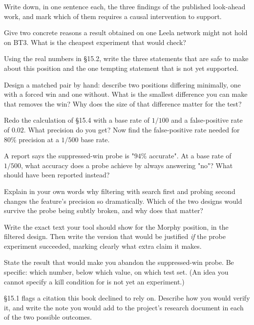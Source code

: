 \begin{exercises}

 Write down, in one sentence each, the three findings of
the published look-ahead work, and mark which of them requires a causal intervention to
support.

 Give two concrete reasons a result obtained on
one Leela network might not hold on BT3. What is the cheapest experiment that would check?

 Using the real numbers in §15.2, write the three
statements that are safe to make about this position and the one tempting statement that is
not yet supported.

 Design a matched pair by hand: describe two positions
differing minimally, one with a forced win and one without. What is the smallest difference
you can make that removes the win? Why does the size of that difference matter for the test?

 Redo the calculation of §15.4 with a base rate of $1/100$
and a false-positive rate of $0.02$. What precision do you get? Now find the false-positive
rate needed for $80\%$ precision at a $1/500$ base rate.

 A report says the suppressed-win probe is "$94\%$
accurate". At a base rate of $1/500$, what accuracy does a probe achieve by always answering
"no"? What should have been reported instead?

 Explain in your own words why filtering with search first
and probing second changes the feature's precision so dramatically. Which of the two designs
would survive the probe being subtly broken, and why does that matter?

 Write the exact text your tool should show
for the Morphy position, in the filtered design. Then write the version that would be
justified \emph{if} the probe experiment succeeded, marking clearly what extra claim it makes.

 State the result that would make you abandon the
suppressed-win probe. Be specific: which number, below which value, on which test set. (An
idea you cannot specify a kill condition for is not yet an experiment.)

 §15.1 flags a citation this book declined to rely on.
Describe how you would verify it, and write the note you would add to the project's research
document in each of the two possible outcomes.

\end{exercises}
